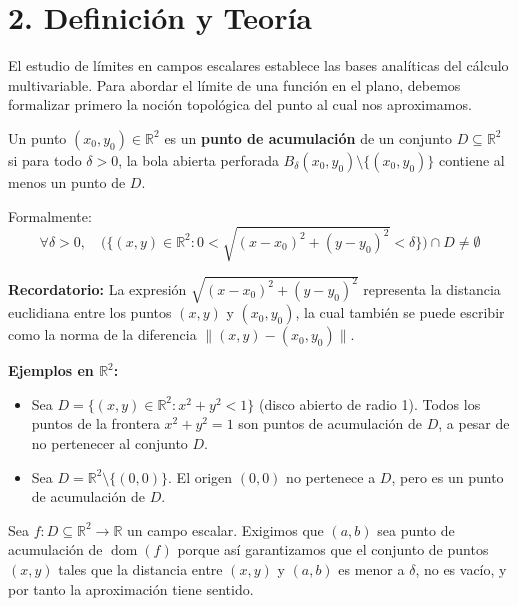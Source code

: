 \documentclass[11pt]{article}
\newenvironment{teoria}{%
  \section*{2. Definición y Teoría}%
}{}
\newenvironment{definicion}[1]{%
  \begin{tcolorbox}[colback=blue!5,colframe=blue!75!black,title=Definición: #1]%
}{%
  \end{tcolorbox}%
}
\begin{document}
\begin{teoria}
  El estudio de límites en campos escalares establece las bases analíticas del cálculo multivariable. Para abordar el límite de una función en el plano, debemos formalizar primero la noción topológica del punto al cual nos aproximamos.

  \begin{definicion}{Punto de Acumulación en $\mathbb{R}^2$}
    Un punto $(x_0, y_0) \in \mathbb{R}^2$ es un \textbf{punto de acumulación} de un conjunto $D \subseteq \mathbb{R}^2$ si para todo $\delta > 0$, la bola abierta perforada $B_\delta(x_0,y_0) \setminus \{(x_0,y_0)\}$ contiene al menos un punto de $D$.
    
    Formalmente:
    $$ \forall \delta > 0, \quad \Big( \{ (x,y) \in \mathbb{R}^2 \colon 0 < \sqrt{(x-x_0)^2 + (y-y_0)^2} < \delta \} \Big) \cap D \neq \emptyset $$
    
    \textbf{Recordatorio:} La expresión $\sqrt{(x-x_0)^2 + (y-y_0)^2}$ representa la distancia euclidiana entre los puntos $(x,y)$ y $(x_0,y_0)$, la cual también se puede escribir como la norma de la diferencia $\|(x,y) - (x_0,y_0)\|$.

    \textbf{Ejemplos en $\mathbb{R}^2$:}
    \begin{itemize}
      \item Sea $D = \{ (x,y) \in \mathbb{R}^2 \colon x^2 + y^2 < 1 \}$ (disco abierto de radio 1). Todos los puntos de la frontera $x^2 + y^2 = 1$ son puntos de acumulación de $D$, a pesar de no pertenecer al conjunto $D$.
      \item Sea $D = \mathbb{R}^2 \setminus \{(0,0)\}$. El origen $(0,0)$ no pertenece a $D$, pero es un punto de acumulación de $D$.
    \end{itemize}
  \end{definicion}

  \begin{definicion}{Límite de un Campo Escalar ($\varepsilon$-$\delta$)}
    Sea $f \colon D \subseteq \mathbb{R}^2 \to \mathbb{R}$ un campo escalar. Exigimos que $(a, b)$ sea punto de acumulación de $\operatorname{dom}(f)$ porque así garantizamos que el conjunto de puntos $(x,y)$ tales que la distancia entre $(x,y)$ y $(a,b)$ es menor a $\delta$, no es vacío, y por tanto la aproximación tiene sentido.
    

\end{definicion}
\end{teoria}
\end{document}
